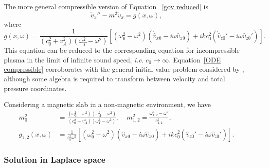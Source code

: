 \documentclass[12pt]{../style-files/ociamthesis}
\begin{document}
The more general compressible version of Equation~ \eqref{gov reduced} is
\begin{equation}
\tilde{v}_x'' - m^2 \tilde{v}_x = g(x, \omega),
\end{equation}
where
\begin{equation}
g(x, \omega) = \frac{1}{(c_0^2 + v_A^2)(\omega_T^2 - \omega^2)}\left[ (\omega_0^2 - \omega^2)\left(\dot{\hat{v}}_{x0} - i\omega \hat{v}_{x0}\right) + ikc_0^2\left( \dot{\hat{v}}_{z0}' - i\omega \hat{v}_{z0}'\right) \right]. \label{ODE compressible}
\end{equation}
This equation can be reduced to the corresponding equation for incompressible plasma in the limit of infinite sound speed, \textit{i.e.} $c_0 \to \infty$.
Equation~\eqref{ODE compressible} corroborates with the general initial value problem considered by \cite{and_etal07}, although some algebra is required to transform between velocity and total pressure coordinates.

Considering a magnetic slab in a non-magnetic environment, we have
\begin{align}
m_0^2 &= \frac{(\omega_0^2 - \omega^2)(\omega_A^2 - \omega^2)}{(c_0^2 + v_A^2)(\omega_T^2 - \omega^2)}, \quad m_{1,2}^2 = \frac{\omega_{1,2}^2 - \omega^2}{c_{1,2}^2}, \\
g_{1,2}(x, \omega) &= \frac{1}{c_0^2\omega^2} \left[ (\omega_0^2 - \omega^2)\left(\dot{\hat{v}}_{x0} - i\omega \hat{v}_{x0}\right) + ikc_0^2\left( \dot{\hat{v}}_{z0}' - i\omega \hat{v}_{z0}'\right) \right].
\end{align}


\subsubsection{Solution in Laplace space}
\end{document}
